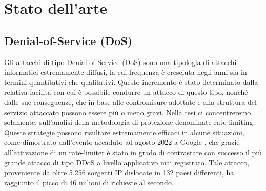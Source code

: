 \chapter{Stato dell'arte}
\label{ch:state of the art}
\section{Denial-of-Service (DoS)}
\label{sec:Denial-of-Service (DoS)}
Gli attacchi di tipo Denial-of-Service (DoS) sono una tipologia di attacchi informatici estremamente diffusi, la cui
frequenza è cresciuta negli anni sia in termini quantitativi che qualitativi. Questo incremento è stato determinato
dalla relativa facilità con cui è possibile condurre un attacco di questo tipo, nonché dalle sue conseguenze, che in
base alle contromisure adottate e alla struttura del servizio attaccato possono essere più o meno gravi. Nella tesi ci
concentreremo solamente, sull'analisi della metodologia di protezione denominate rate-limiting. Queste strategie possono
risultare estremamente efficaci in alcune situazioni, come dimostrato dall'evento accaduto ad agosto 2022 a Google
\cite{google_ddos}, che grazie all’attivazione di un rate-limiter è stato in grado di contrastare con successo il più
grande attacco di tipo DDoS a livello applicativo mai registrato. Tale attacco, proveniente da oltre 5.256 sorgenti IP
dislocate in 132 paesi differenti, ha raggiunto il picco di 46 milioni di richieste al secondo.


